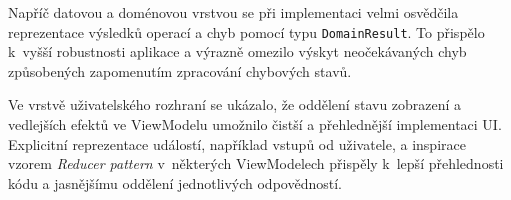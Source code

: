 Napříč datovou a doménovou vrstvou se při implementaci velmi osvědčila reprezentace výsledků operací a chyb pomocí typu \texttt{Domain\-Result}.
To přispělo k~vyšší robustnosti aplikace a výrazně omezilo výskyt neočekávaných chyb způsobených zapomenutím zpracování chybových stavů.

Ve vrstvě uživatelského rozhraní se ukázalo, že oddělení stavu zobrazení a vedlejších efektů ve ViewModelu umožnilo čistší a přehlednější implementaci UI\@.
Explicitní reprezentace událostí, například vstupů od uživatele, a inspirace vzorem \textit{Reducer pattern} v~některých ViewModelech přispěly k~lepší přehlednosti kódu a jasnějšímu oddělení jednotlivých odpovědností.